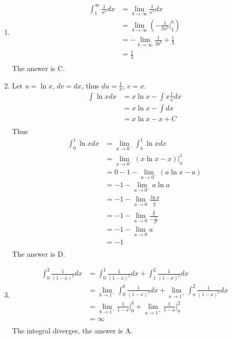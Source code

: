 \documentclass{article}
\begin{document}
\newpage
\begin{enumerate}
    \item 
    \begin{align*}
        \int_{1}^{\infty} \frac{1}{x^4} dx &= \lim_{b\to \infty} \frac{1}{x^4} dx\\
        &= \lim_{b\to \infty} \left(-\frac{1}{3x^3}\Big|_1^b\right)\\
        &= -\lim_{b\to \infty} \frac{1}{3b^3} + \frac{1}{3}\\
        &= \frac{1}{3}\\
    \end{align*}
    The answer is C.

    \item Let $u = \ln x$, $dv = dx$, thus $\displaystyle du = \frac{1}{x}$, $v = x$.
    \begin{align*}
        \int \ln x dx &= x \ln x - \int x\frac{1}{x}dx\\
        &= x\ln x - \int dx\\
        &= x\ln x - x +C\\
    \end{align*}
    Thus 
    \begin{align*}
        \int_{0}^{1} \ln x dx &= \lim_{a\to 0^-} \int_{a}^{1} \ln x dx\\
        &= \lim_{a\to 0^-} (x\ln x - x) \Big|_a^1\\
        &= 0 - 1 - \lim_{a\to 0^-} (a\ln x - a)\\
        &= -1 - \lim_{a\to 0^-} a\ln a\\
        &= -1 - \lim_{a\to 0} \frac{\ln a}{\frac{1}{a}}\\
        &= -1 - \lim_{a\to 0} \frac{\frac{1}{a}}{-\frac{1}{a^2}}\\
        &= -1 -\lim_{a\to 0} a\\
        &= -1\\
    \end{align*}
    The answer is D.

    \item 
    \begin{align*}
        \int_{0}^{2} \frac{1}{(1-x)^2}dx &= \int_{0}^{1} \frac{1}{(1-x)^2}dx + \int_{1}^{2} \frac{1}{(1-x)^2}dx\\
        &= \lim_{b\to 1^-}\int_{0}^{b} \frac{1}{(1-x)^2}dx + \lim_{a\to 1^+} \int_{a}^{2} \frac{1}{(1-x)^2}dx\\
        &= \lim_{b\to 1^-}\frac{1}{1-x} \Big|_0^b + \lim_{a\to 1^+} \frac{1}{1-x}\Big|_a^2\\
        &= \infty\\
    \end{align*}
    The integral diverges, the answer is A.


\end{enumerate}
\end{document}
